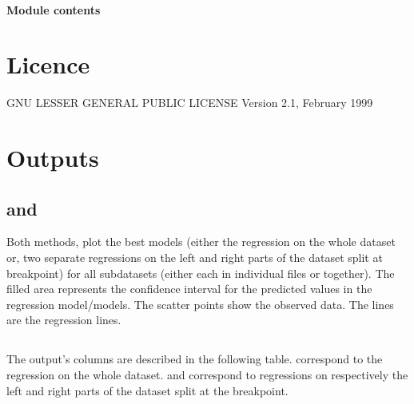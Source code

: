 \documentclass[letterpaper,10pt,english]{sphinxmanual}
\begin{document}
\subsubsection{Module contents}
\label{\detokenize{source/chowclassifier:module-chowclassifier}}\label{\detokenize{source/chowclassifier:module-contents}}

\chapter{Licence}
\label{\detokenize{index:licence}}
\sphinxAtStartPar
GNU LESSER GENERAL PUBLIC LICENSE
Version 2.1, February 1999


\chapter{Outputs}
\label{\detokenize{index:outputs}}

\section{ and }
\label{\detokenize{index:plot-and-plot-individually}}
\sphinxAtStartPar
Both methods, plot the best models (either the regression on the whole dataset or, two separate regressions on the left and right parts of the dataset split at breakpoint) for all subdatasets (either each in individual files or together).
The filled area represents the confidence interval for the predicted values in the regression model/models. The scatter points show the observed data. The lines are the regression lines.


\section{}
\label{\detokenize{index:save-to-file}}
\sphinxAtStartPar
The output’s columns are described in the following table.  correspond to the regression on the whole dataset.  and  correspond to regressions on respectively the left and right parts of the dataset split at the breakpoint.
\end{document}

